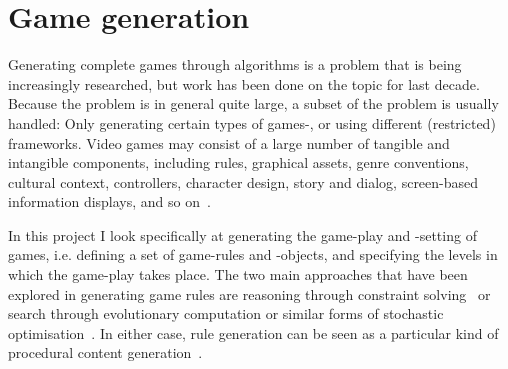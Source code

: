 \documentclass[a4paper,titlepage,final]{report}
\begin{document}
\section{Game generation}
\label{sec_gamegen}
Generating complete games through algorithms is a problem that is being increasingly researched, but work has been done on the topic for last decade. Because the problem is in general quite large, a subset of the problem is usually handled: Only generating certain types of games-, or using different (restricted) frameworks. 
Video games may consist of a large number of tangible and intangible components, including rules, graphical assets, genre conventions, cultural context, controllers, character design, story and dialog, screen-based information displays, and so on~\citet{cook2014angelina,liapis2014creativity,nelson2007automated}.

In this project I look specifically at generating the game-play and -setting of games, i.e. defining a set of game-rules and -objects, and specifying the levels in which the game-play takes place.
The two main approaches that have been explored in generating game rules are reasoning through constraint solving~\citet{smith2010variations} or search through evolutionary computation or similar forms of stochastic optimisation~\citet{togelius2008experiment,browne2008automated,font2013towards}. 
In either case, rule generation can be seen as a particular kind of procedural content generation~\citet{pcgbook:ch6}.


\end{document}
